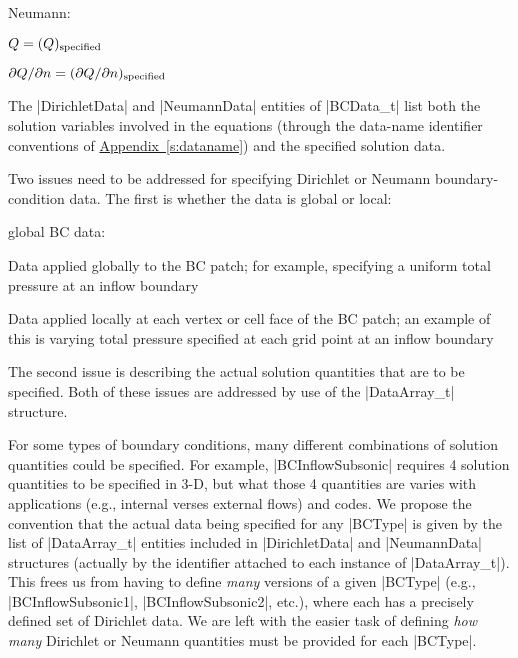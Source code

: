 \begin{Ventryi}{Neumann:}
   \item [Dirichlet:]
         $Q         = (Q)_{\rm specified}$
   \item [Neumann:]
         ${\partial Q / \partial n} = ( {\partial Q / \partial n} )_{\rm specified}$
\end{Ventryi}

The |DirichletData| and |NeumannData| entities of
|BCData_t| list both the solution variables involved in the
equations (through the data-name identifier conventions of
\hyperref[s:dataname]{Appendix~\ref*{s:dataname}}) and the specified
solution data.

Two issues need to be addressed for specifying Dirichlet or Neumann 
boundary-condition data.  The first is whether the data is global or local: 

\begin{Ventryi}{global BC data:}
   \item [Global BC data:]
         Data applied globally to the BC patch; for example, specifying
         a uniform total pressure at an inflow boundary
   \item [Local BC data:]
         Data applied locally at each vertex or cell face
         of the BC patch; an example of this is varying total pressure
         specified at each grid point at an inflow boundary
\end{Ventryi}
The second issue is describing the actual solution quantities that are
to be specified.  Both of these issues are addressed by use of the
|DataArray_t| structure.

For some types of boundary conditions, many different combinations of
solution quantities could be specified.  For example, |BCInflowSubsonic|
requires 4 solution quantities to be specified in 3-D, but what those 4
quantities are varies with applications (e.g., internal verses external
flows) and codes.  We propose the convention that the actual data
being specified for any |BCType| is given by the list of |DataArray_t|
entities included in |DirichletData| and |NeumannData| structures
(actually by the identifier attached to each instance of |DataArray_t|).
This frees us from having to define \emph{many} versions of a given
|BCType| (e.g., |BCInflowSubsonic1|, |BCInflowSubsonic2|, etc.), where
each has a precisely defined set of Dirichlet data.  We are left with
the easier task of defining \emph{how many} Dirichlet or Neumann
quantities must be provided for each |BCType|.

